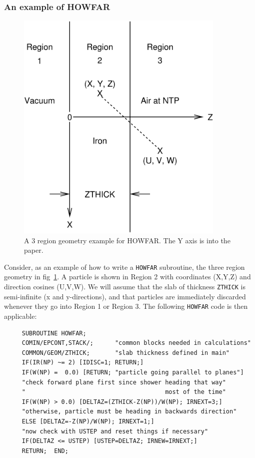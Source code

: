 \subsubsection{An example of HOWFAR}

\begin{figure}[htp]
   \begin{center}
   \leavevmode
   \mbox{}\hspace{-1mm}
   \includegraphics[width=10cm]{figures/3_region_ex}
   \end{center}
   \caption{A 3 region geometry example for HOWFAR.  The Y axis is into the
paper.}
   \label{fig_3_region_ex}
\end{figure}
Consider, as an example of how to write a {\tt HOWFAR} subroutine, the three
region geometry in fig~\ref{fig_3_region_ex}.  A particle is shown in
Region 2 with coordinates (X,Y,Z) and direction cosines (U,V,W).  We will
assume that the slab of thickness {\tt ZTHICK} is semi-infinite (x and
y-directions), and that particles are immediately discarded whenever they
go into Region 1 or Region 3.  The following {\tt HOWFAR} code is then
applicable:
\begin{verbatim}
     SUBROUTINE HOWFAR;
     COMIN/EPCONT,STACK/;      "common blocks needed in calculations"
     COMMON/GEOM/ZTHICK;       "slab thickness defined in main"
     IF(IR(NP) ~= 2) [IDISC=1; RETURN;]
     IF(W(NP) =  0.0) [RETURN; "particle going parallel to planes"]
     "check forward plane first since shower heading that way"
     "                                       most of the time"
     IF(W(NP) > 0.0) [DELTAZ=(ZTHICK-Z(NP))/W(NP); IRNEXT=3;]
     "otherwise, particle must be heading in backwards direction"
     ELSE [DELTAZ=-Z(NP)/W(NP); IRNEXT=1;]
     "now check with USTEP and reset things if necessary"
     IF(DELTAZ <= USTEP) [USTEP=DELTAZ; IRNEW=IRNEXT;]
     RETURN;  END;
\end{verbatim}


